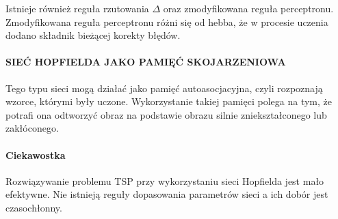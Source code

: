 Istnieje również reguła rzutowania $\Delta$ oraz zmodyfikowana reguła perceptronu.
Zmodyfikowana reguła perceptronu różni się od hebba, że w procesie uczenia dodano składnik
bieżącej korekty błędów.

\paragraph{SIEĆ HOPFIELDA JAKO PAMIĘĆ SKOJARZENIOWA}

Tego typu sieci mogą 
działać jako pamięć 
autoasocjacyjna, czyli 
rozpoznają wzorce, 
którymi były uczone.
Wykorzystanie takiej pamięci
polega na tym, że potrafi ona
odtworzyć obraz na podstawie
obrazu silnie zniekształconego
lub zakłóconego.

\paragraph{Ciekawostka}

Rozwiązywanie problemu TSP przy wykorzystaniu
sieci Hopfielda jest mało efektywne. Nie istnieją
reguły dopasowania parametrów sieci a ich dobór
jest czasochłonny.